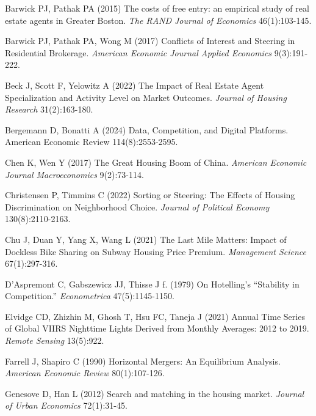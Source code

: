 \documentclass[11pt]{article}
\begin{document}
\begin{singlespace}
\begin{thebibliography}{}
Barwick PJ, Pathak PA (2015) The costs of free entry: an empirical study of real estate agents in Greater Boston. \textit{The RAND Journal of Economics} 46(1):103-145.

Barwick PJ, Pathak PA, Wong M (2017) Conflicts of Interest and Steering in Residential Brokerage. \textit{American Economic Journal Applied Economics} 9(3):191-222.

Beck J, Scott F, Yelowitz A (2022) The Impact of Real Estate Agent Specialization and Activity Level on Market Outcomes. \textit{Journal of Housing Research} 31(2):163-180.

Bergemann D, Bonatti A (2024) Data, Competition, and Digital Platforms. American Economic Review 114(8):2553-2595.

Chen K, Wen Y (2017) The Great Housing Boom of China. \textit{American Economic Journal Macroeconomics} 9(2):73-114.

Christensen P, Timmins C (2022) Sorting or Steering: The Effects of Housing Discrimination on Neighborhood Choice. \textit{Journal of Political Economy} 130(8):2110-2163.

Chu J, Duan Y, Yang X, Wang L (2021) The Last Mile Matters: Impact of Dockless Bike Sharing on Subway Housing Price Premium. \textit{Management Science} 67(1):297-316.

D'Aspremont C, Gabszewicz JJ, Thisse J f. (1979) On Hotelling's “Stability in Competition.” \textit{Econometrica} 47(5):1145-1150.

Elvidge CD, Zhizhin M, Ghosh T, Hsu FC, Taneja J (2021) Annual Time Series of Global VIIRS Nighttime Lights Derived from Monthly Averages: 2012 to 2019. \textit{Remote Sensing} 13(5):922.

Farrell J, Shapiro C (1990) Horizontal Mergers: An Equilibrium Analysis. \textit{American Economic Review} 80(1):107-126.

Genesove D, Han L (2012) Search and matching in the housing market. \textit{Journal of Urban Economics} 72(1):31-45.


\end{thebibliography}
\end{singlespace}
\end{document}

